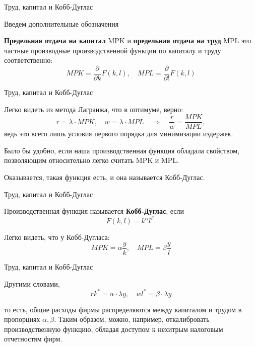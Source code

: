 \documentclass{beamer}
\begin{document}
\begin{frame}{Труд, капитал и Кобб-Дуглас}

Введем дополнительные обозначения

\begin{definition}
\textbf{Предельная отдача на капитал} MPK и \textbf{предельная отдача на труд} MPL это частные производные производственной функции по капиталу и труду соответственно:
$$MPK = \frac{\partial}{\partial k}F(k,l), \quad MPL = \frac{\partial}{\partial l}F(k,l)$$
\end{definition}

\end{frame}

\begin{frame}{Труд, капитал и Кобб-Дуглас}

Легко видеть из метода Лагранжа, что в оптимуме, верно:
$$ r = \lambda \cdot MPK, \quad w = \lambda \cdot MPL \quad \Rightarrow \quad \frac{r}{w} = \frac{MPK}{MPL},$$
ведь это всего лишь условия первого порядка для минимизации издержек.

Было бы удобно, если наша производственная функция обладала свойством, позволяющим относительно легко считать MPK и MPL. 

Оказывается, такая функция есть, и она называется Кобб-Дуглас.

\end{frame}

\begin{frame}{Труд, капитал и Кобб-Дуглас}

\begin{definition}
Производственная функция называется \textbf{Кобб-Дуглас}, если 
$$ F(k,l) = k^{\alpha} l^{\beta}.$$
\end{definition}

Легко видеть, что у Кобб-Дугласа:
$$ MPK = \alpha \frac{y}{k}, \quad  MPL = \beta \frac{y}{l}$$

\end{frame}

\begin{frame}{Труд, капитал и Кобб-Дуглас}

Другими словами,
$$ r k^{\ast} = \alpha \cdot \lambda y, \quad w l^{\ast} = \beta \cdot \lambda y$$

то есть, общие расходы фирмы распределяются между капиталом и трудом в пропорциях $\alpha, \beta$. Таким образом, можно, например, откалибровать производственную функцию, обладая доступом к нехитрым налоговым отчетностям фирм.

\end{frame}
\end{document}
